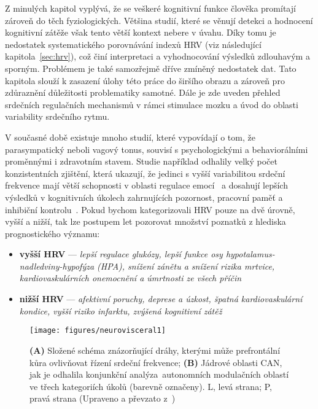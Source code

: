 Z minulých kapitol vyplývá, že se veškeré kognitivní funkce člověka promítají
zároveň do těch fyziologických. Většina studií, které se věnují detekci a
hodnocení kognitivní zátěže však tento větší kontext nebere v úvahu. Díky tomu
je nedostatek systematického porovnávání indexů HRV (viz následující
kapitola~\ref{sec:hrv}), což činí interpretaci a vyhodnocování výsledků
zdlouhavým a sporným. Problémem je také samozřejmě dříve zmíněný nedostatek dat.
Tato kapitola slouží k zasazení úlohy této práce do širšího obrazu a zároveň pro
zdůraznění důležitosti problematiky samotné. Dále je zde uveden přehled
srdečních regulačních mechanismů v rámci stimulace mozku a úvod do oblasti
variability srdečního rytmu.

V současné době existuje mnoho studií, které vypovídají o tom, že parasympatický
neboli vagový tonus, souvisí s psychologickými a behaviorálními proměnnými i
zdravotním stavem. Studie například odhalily velký počet konzistentních
zjištění, která ukazují, že jedinci s vyšší variabilitou srdeční frekvence mají
větší schopnosti v oblasti regulace emocí~\cite{Appelhans_Luecken_2006,
    Butler_Wilhelm_Gross_2006,Ingjaldsson_Laberg_Thayer_2003,Lane_2008,
    Melzig_Weike_Hamm_Thayer_2009, Thayer_Brosschot_2005} a dosahují lepších
výsledků v kognitivních úkolech zahrnujících pozornost, pracovní paměť a
inhibiční kontrolu~\cite{Thayer2009,Hansen_Johnsen_Thayer_2003,
    Johnsen_Thayer_Laberg_Wormnes_Raadal_Skaret_Kvale_Berg_2003,
    Saus_Johnsen_Eid_Riisem_Andersen_Thayer_2006}. Pokud bychom kategorizovali HRV
pouze na dvě úrovně, vyšší a nižší, tak lze postupem let pozorovat množství
poznatků z hlediska prognostického významu:
\begin{itemize}
    \item \textbf{vyšší HRV} --- \emph{lepší regulace glukózy, lepší funkce osy
              hypotalamus-nadledviny-hypofýza (HPA), snížení zánětu a snížení rizika
              mrtvice, kardiovaskulárních onemocnění a úmrtnosti ze všech
              příčin}~\cite{Brosschot_Thayer_2007,Liao_Carnethon_Evans_Cascio_Heiss_2002,Thayer_Fischer_2009,Thayer_Lane_2007}
    \item \textbf{nižší HRV} --- \emph{afektivní poruchy, deprese a úzkost,
              špatná kardiovaskulární kondice, vyšší riziko infarktu, zvýšená kognitivní
              zátěž}~\cite{Gorman_Sloan_2000,Kemp_Quintana_2013,Kemp_Quintana_Felmingham_Matthews_Jelinek_2012}
\end{itemize}

\begin{figure}[h]
    \begin{center}
        \texttt{[image: figures/neurovisceral1]}
        \caption{\textbf{(A)} Složené schéma znázorňující dráhy, kterými může
        prefrontální kůra ovlivňovat řízení srdeční frekvence; \textbf{(B)}
        Jádrové oblasti \gls{CAN}, jak je odhalila konjunkční
        analýza\protect\footnotemark\ autonomních modulačních oblastí ve třech
        kategoriích úkolů (barevně označeny). L, levá strana; P, pravá strana
        (Upraveno a převzato z~\cite{gianaros2008,Beissner2013})}
        \label{fig:neurovisceral_diagram}
    \end{center}
\end{figure}

